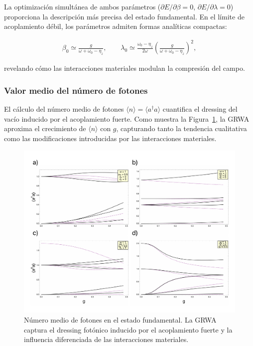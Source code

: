 \documentclass[onecolumn,notitlepage,letterpaper,aps,pra,12pt]{article}
\numberwithin{equation}{section}
\begin{document}
La optimización simultánea de ambos parámetros ($\partial E/\partial\beta = 0$, $\partial E/\partial\lambda = 0$) proporciona la descripción más precisa del estado fundamental. En el límite de acoplamiento débil, los parámetros admiten formas analíticas compactas:

\begin{gather}
\beta_{0} \simeq \frac{g}{\omega + \omega_{0}-\eta_{z}}, \qquad \lambda_{0} \simeq \frac{\omega_{0}-\eta_{z}}{2\omega} \left( \frac{g}{\omega + \omega_{0} -\eta_{z}} \right)^{2},
\end{gather}

revelando cómo las interacciones materiales modulan la compresión del campo.

\subsubsection{Valor medio del número de fotones}

El cálculo del número medio de fotones $\langle n \rangle = \langle a^{\dagger}a \rangle$ cuantifica el dressing del vacío inducido por el acoplamiento fuerte. Como muestra la Figura~\ref{fig:Expectation Value}, la GRWA aproxima el crecimiento de $\langle n \rangle$ con $g$, capturando tanto la tendencia cualitativa como las modificaciones introducidas por las interacciones materiales.

\begin{figure}[H]
    \centering
    \includegraphics[width=0.95\linewidth]{Images APS v1/Promedio.pdf}
    \caption{Número medio de fotones en el estado fundamental. La GRWA captura el dressing fotónico inducido por el acoplamiento fuerte y la influencia diferenciada de las interacciones materiales.}
    \label{fig:Expectation Value}
\end{figure}
\end{document}

